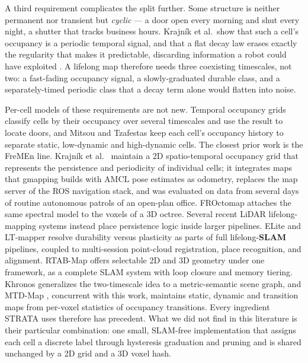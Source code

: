 \documentclass[conference]{IEEEtran}
\begin{document}
A third requirement complicates the split further. Some structure is neither
permanent nor transient but \emph{cyclic} --- a door open every morning and shut every
night, a shutter that tracks business hours. Krajn\'ik et al.\ show that such a
cell's occupancy is a periodic temporal signal, and that a flat decay law
erases exactly the regularity that makes it predictable, discarding information
a robot could have exploited \cite{krajnik2017fremen,krajnik2014spectral}. A
lifelong map therefore needs three coexisting timescales, not two: a fast-fading
occupancy signal, a slowly-graduated durable class, and a separately-timed
periodic class that a decay term alone would flatten into noise.

Per-cell models of these requirements are not new. Temporal occupancy grids
\cite{arbuckle2002temporal} classify cells by their occupancy over several
timescales and use the result to locate doors, and Mitsou and Tzafestas
\cite{mitsou2007temporal} keep each cell's occupancy history to separate
static, low-dynamic and high-dynamic cells. The closest prior work is the
FreMEn line. Krajn\'ik et al.\ \cite{krajnik2016persistent} maintain a 2D
spatio-temporal occupancy grid that represents the persistence and periodicity
of individual cells; it integrates maps that gmapping builds with AMCL pose
estimates as odometry, replaces the map server of the ROS navigation stack,
and was evaluated on data from several days of routine autonomous patrols of
an open-plan office. FROctomap \cite{krajnik2014froctomap} attaches the same
spectral model to the voxels of a 3D octree. Several recent LiDAR
lifelong-mapping systems instead place persistence logic inside larger
pipelines. ELite \cite{gil2025elite} and LT-mapper \cite{kim2022ltmapper}
resolve durability versus plasticity as parts of full lifelong-\textbf{SLAM}
pipelines, coupled to multi-session point-cloud registration, place
recognition, and alignment. RTAB-Map \cite{labbe2019rtabmap} offers selectable
2D and 3D geometry under one framework, as a complete SLAM system with loop
closure and memory tiering. Khronos \cite{schmid2024khronos} generalizes the
two-timescale idea to a metric-semantic scene graph, and MTD-Map
\cite{kim2026mtdmap}, concurrent with this work, maintains static, dynamic and
transition maps from per-voxel statistics of occupancy transitions. Every
ingredient STRATA uses therefore has precedent. What we did not find in this
literature is their particular combination: one small, SLAM-free
implementation that assigns each cell a discrete label through hysteresis
graduation and pruning and is shared unchanged by a 2D grid and a 3D voxel
hash.
\end{document}

